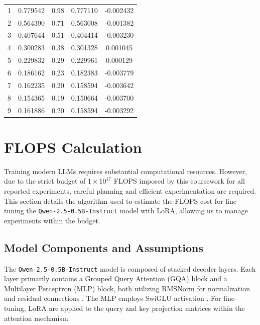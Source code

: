 \documentclass{article}
\begin{document}
\begin{table}[!thbp]
\begin{minipage}{0.48\textwidth}
\begin{tabular}{ccccc}
        1 & 0.779542 & 0.98 & 0.777110 & -0.002432 \\
        2 & 0.564390 & 0.71 & 0.563008 & -0.001382 \\
        3 & 0.407644 & 0.51 & 0.404414 & -0.003230 \\
        4 & 0.300283 & 0.38 & 0.301328 & 0.001045 \\
        5 & 0.229832 & 0.29 & 0.229961 & 0.000129 \\
        6 & 0.186162 & 0.23 & 0.182383 & -0.003779 \\
        7 & 0.162235 & 0.20 & 0.158594 & -0.003642 \\
        8 & 0.154365 & 0.19 & 0.150664 & -0.003700 \\
        9 & 0.161886 & 0.20 & 0.158594 & -0.003292 \\
        \bottomrule
    \end{tabular}
\end{minipage}
\end{table}






\section{FLOPS Calculation}
\label{sec:flops}

Training modern LLMs requires substantial computational resources. However, due to the strict budget of $1 \times 10^{17}$ FLOPS imposed by this coursework for all reported experiments, careful planning and efficient experimentation are required. This section details the algorithm used to estimate the FLOPS cost for fine-tuning the \texttt{Qwen-2.5-0.5B-Instruct} model with LoRA, allowing us to manage experiments within the budget.

\subsection{Model Components and Assumptions}

The \texttt{Qwen-2.5-0.5B-Instruct} model is composed of stacked decoder layers. Each layer primarily contains a Grouped Query Attention (GQA) block and a Multilayer Perceptron (MLP) block, both utilizing RMSNorm \cite{zhang2019rootmeansquarelayer} for normalization and residual connections \cite{he2015deepresiduallearningimage}. The MLP employs SwiGLU activation \cite{shazeer2020gluvariantsimprovetransformer}. For fine-tuning, LoRA \cite{hu2021loralowrankadaptationlarge} are applied to the query and key projection matrices within the attention mechanism.
\end{document}
